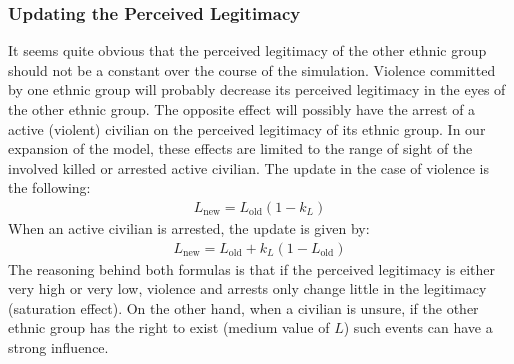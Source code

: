 \documentclass[11pt]{article}
\begin{document}
\subsubsection{Updating the Perceived Legitimacy}
It seems quite obvious that the perceived legitimacy of the other ethnic group should not be a constant over the course of the simulation. Violence committed by one ethnic group will probably decrease its perceived legitimacy in the eyes of the other ethnic group. The opposite effect will possibly have the arrest of a active (violent) civilian on the perceived legitimacy of its ethnic group. In our expansion of the model, these effects are limited to the range of sight of the involved killed or arrested active civilian. The update in the case of violence is the following:
\begin{align}
L_{\text{new}} = L_{\text{old}} \left( 1 - k_L \right)
\label{eqn:update_violence}
\end{align}
When an active civilian is arrested, the update is given by:
\begin{align}
L_{\text{new}} = L_{\text{old}} + k_L \left( 1 - L_{\text{old}} \right)
\end{align}
The reasoning behind both formulas is that if the perceived legitimacy is either very high or very low, violence and arrests only change little in the legitimacy (saturation effect). On the other hand, when a civilian is unsure, if the other ethnic group has the right to exist (medium value of $L$) such events can have a strong influence.
\end{document}

